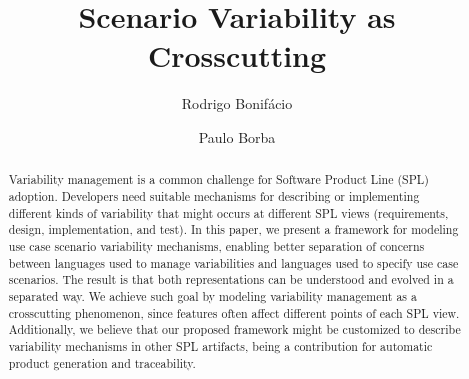 \documentclass{llncs}
\begin{document}
\lstset{language=Haskell, numbers=left,
numberstyle=\tiny,numbersep=5pt,basicstyle=\scriptsize,aboveskip=20pt}
%
\frontmatter          %
%
\pagestyle{headings}  %

\mainmatter              %

\title{Scenario Variability as Crosscutting}
%
%
\author{Rodrigo Bonif\'{a}cio \and Paulo Borba}
%
%
%

\maketitle              %

\begin{abstract}
Variability management is a common challenge for Software Product
Line (SPL) adoption. Developers need suitable
mechanisms for describing or implementing different kinds of variability
that might occurs at different SPL views (requirements, design,
implementation, and test). In this paper, we present a framework for
modeling use case scenario variability mechanisms, enabling better
separation of concerns between languages used to manage
variabilities and languages used to specify use case scenarios. The
result is that both representations can be understood and evolved in
a separated way. We achieve such goal by modeling variability management
as a crosscutting phenomenon, since features often affect
different points of each SPL view. Additionally, we believe that our proposed framework might be customized to 
describe variability mechanisms in other SPL artifacts, being a contribution for automatic product generation and traceability.
\end{abstract}
%
\end{document}
